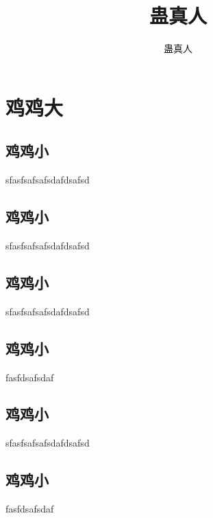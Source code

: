 \documentclass[hyperref,UTF8]{ctexrep}
\title{蛊真人}
\author{蛊真人}
\newenvironment{thisBody}
	{
	}%
	{
		\clearpage
	}%
\begin{document}
\maketitle%
\tableofcontents%
 

\chapter{鸡鸡大}
\section{鸡鸡小}
	\begin{thisBody} 
		sfasfsafsafsdafdsafsd
	\end{thisBody}
\section{鸡鸡小}
	\begin{thisBody} 
		sfasfsafsafsdafdsafsd
	\end{thisBody}
\section{鸡鸡小}
	\begin{thisBody} 
		sfasfsafsafsdafdsafsd
	\end{thisBody}
\section{鸡鸡小}
	\begin{thisBody} 
		fasfdsafsdaf 
	\end{thisBody}
\section{鸡鸡小}
	\begin{thisBody} 
		sfasfsafsafsdafdsafsd
	\end{thisBody}
\section{鸡鸡小}
	\begin{thisBody} 
		fasfdsafsdaf 
	\end{thisBody}
\end{document}
